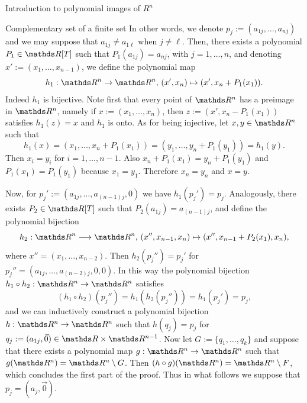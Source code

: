 \documentclass[11pt, a4paper, english, twoside, notitlepage, openright]{report}
\begin{document}
\begin{chapter}{Introduction to polynomial images of $R^n$}
\begin{section}{Complementary set of a finite set}
In other words, we denote $p_j:=(a_{1j},\dots,a_{nj})$ and we may suppose that $a_{1j}\neq a_{1\ell}$ when $j\neq\ell$. Then, there exists a polynomial $P_1\in\R[T]$ such that $P_1(a_{1j})=a_{nj}$, with $j = 1,\dots, n$, and denoting $x':=(x_1,\dots,x_{n-1})$, we  define the polynomial map 
$$
h_1:\R^n\to\R^n,\, (x',x_n)\mapsto (x',x_n+P_1(x_1)).
$$
Indeed $h_1$ is bijective. Note first that every point of $\R^n$ has a preimage in $\R^n$, namely if $x:=(x_1, \dots,x_n)$, then $z:=(x',x_n-P_1(x_1))$ satisfies $h_1(z)=x$ and $h_1$ is onto. As for being injective, let $x,y\in\R^n$ such that 
$$
h_1(x)=(x_1,\dots,x_n+ P_1(x_1))=(y_1,\dots,y_n+ P_1(y_1))=h_1(y).
$$ 
Then $x_i=y_i$ for $i=1,\dots,n-1$. Also $x_n+P_1(x_1)=y_n+P_1(y_1)$ and $P_1(x_1)=P_1(y_1)$ because $x_1= y_1$. Therefore $x_n=y_n$ and $x=y$.
		
Now, for $p_j':=(a_{1j},\dots,a_{(n-1)j},0)$ we have $h_1(p_j')=p_j$. Analogously, there exists $P_2\in\R[T]$ such that $P_2(a_{1j}) = a_{(n-1)j}$, and define the polynomial bijection
$$
h_2:\R^n\longrightarrow \R^n,\,(x'',x_{n-1},x_n)\mapsto (x'',x_{n-1}+P_2(x_1),x_n),
$$
where $x''=(x_1,\dots,x_{n-2})$. Then $h_2(p_j'')=p_j'$ for $p_j''= (a_{1j},\dots,a_{(n-2)j},0,0)$. In this way the polynomial bijection $h_1\circ h_2:\R^n\to\R^n$ satisfies
$$
(h_1\circ h_2)(p_j'')=h_1(h_2(p_j''))=h_1(p_j')=p_j,
$$
and we can inductively construct a polynomial bijection $h:\R^n\rightarrow\R^n$ such that $h(q_j)=p_j$ for $q_j:=(a_{1j},\vec{0})\in\R\times\R^{n-1}$. Now let $G:=\{q_1,\dots,q_k\}$ and suppose that there exists a polynomial map $g:\R^n\rightarrow\R^n$ such that $g(\R^n)=\R^n\setminus G$. Then $(h\circ g)(\R^n) = \R^n \setminus F$, which concludes the first part of the proof. Thus in what follows we suppose that $p_j=(a_j,\vec{0})$.
		

\end{section}
\end{chapter}
\end{document}
